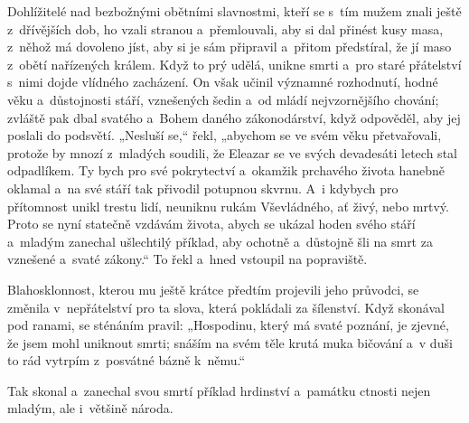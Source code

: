{{Dohlížitelé nad bezbožnými obětními slavnostmi, kteří se s~tím mužem znali
ještě z~dří\-věj\-ších dob, ho vzali stranou a~přemlouvali, aby si dal přinést
kusy masa, z~něhož má dovoleno jíst, aby si je sám připravil a~přitom
předstíral, že jí maso z~obětí nařízených králem. Když to prý udělá, unikne
smrti a~pro staré přátelství s~nimi dojde vlídného zacházení. On však učinil
významné rozhodnutí, hodné věku a~důstojnosti stáří, vznešených šedin a~od
mládí nejvzornějšího chování; zvláště pak dbal svatého a~Bohem daného
zákonodárství, když odpověděl, aby jej poslali do podsvětí. „Nesluší se,“
řekl, „abychom se ve svém věku přetvařovali, protože by mnozí z~mladých
soudili, že Eleazar se ve svých devadesáti letech stal odpadlíkem. Ty bych
pro své pokrytectví a~okamžik prchavého ži\-vo\-ta hanebně oklamal a~na své
stáří tak přivodil potupnou skvrnu. A~i kdybych pro přítomnost unikl trestu
lidí, neuniknu rukám Vševládného, ať živý, nebo mrtvý. Proto se nyní
statečně vzdávám ži\-vo\-ta, abych se ukázal hoden svého stáří a~mladým zanechal
ušlechtilý příklad, aby ochotně a~důstojně šli na smrt za vznešené a~svaté
zákony.“ To řekl a~hned vstoupil na popraviště.

Blahosklonnost, kterou mu ještě krátce předtím projevili jeho průvodci, se
změnila v~nepřátelství pro ta slova, která pokládali za šílenství. Když
skonával pod ranami, se sténáním pravil: „Hospodinu, který má svaté poznání,
je zjevné, že jsem mohl uniknout smrti; snáším na svém těle krutá muka
bičování a~v duši to rád vytrpím z~posvátné bázně k~němu.“

Tak skonal a~zanechal svou smrtí příklad hrdinství a~památku ctnosti nejen
mladým, ale i~většině národa.}}


